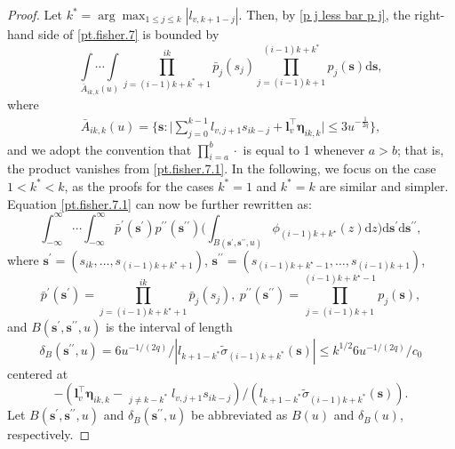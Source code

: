 \documentclass[ejsv2]{imsart}
\theoremstyle{plain}
\theoremstyle{definition}
\theoremstyle{remark}
\begin{document}
\begin{proof}
Let $k^\ast=\arg\max_{1\leq j\leq k}|l_{v,k+1-j}|$. Then, by \eqref{p j less bar p j}, the right-hand side of \eqref{pt.fisher.7} is bounded by
\begin{equation}\label{pt.fisher.7.1}
\underset{\bar{A}_{ik, k}(u)}{\int\cdots\int}\prod_{j=(i-1)k+k^{\ast}+1}^{ik}\bar{p}_j(s_j)\prod_{j=(i-1)k+1}^{(i-1)k+k^{\ast}}p_j(\mathbf{s})\mathrm{d}\mathbf{s},
\end{equation}
where 
\begin{equation*}\label{ing108}
\begin{split}
\bar{A}_{ik,k}(u)
=\bigg\{\mathbf{s}: \bigg|\sum_{j=0}^{k-1}l_{v,j+1}s_{ik-j}+\bm{l}_v^\top\bm{\eta}_{ik, k}\bigg|
\leq 3u^{-\frac{1}{2q}}\bigg\},
\end{split}
\end{equation*}
and we adopt the convention that
$\prod_{i=a}^{b} \cdot$ is equal to 1 whenever
$a>b$; that is, the product
vanishes from \eqref{pt.fisher.7.1}. 
In the following, we focus on the case
$1<k^{*}<k$, as the proofs for the cases
$k^{*}=1$ and $k^{*}=k$
are similar and simpler.
Equation
\eqref{pt.fisher.7.1}
can now be further rewritten as:
\begin{equation}\label{pt.fisher.7.2}
\int_{-\infty}^{\infty}\cdots\int_{-\infty}^{\infty}\bar{p}^{\prime}(\mathbf{s}^\prime)p^{\prime\prime}(\mathbf{s}^{\prime\prime})
\bigg(\int_{B(\mathbf{s}^{\prime},\mathbf{s}^{\prime\prime},u)}\phi_{(i-1)k+k^{\star}}(z)\mathrm{d}z\bigg)\mathrm{d}\mathbf{s}^{\prime}\mathrm{d}\mathbf{s}^{\prime\prime},
\end{equation}
where $\mathbf{s}^{\prime}=(s_{ik},\ldots,s_{(i-1)k+k^{\star}+1})$, $\mathbf{s}^{\prime\prime}=(s_{(i-1)k+k^{\star}-1},\ldots,s_{(i-1)k+1})$, 
$$\bar{p}^{\prime}(\mathbf{s}^\prime)=\prod_{j=(i-1)k+k^\star+1}^{ik}\bar{p}_j(s_j),\ p^{\prime\prime}(\mathbf{s}^{\prime\prime})=\prod_{j=(i-1)k+1}^{(i-1)k+k^\star-1}p_j(\mathbf{s}),$$
and $B(\mathbf{s}^{\prime},\mathbf{s}^{\prime\prime},u)$ is the interval of length 
$$\delta_B(\mathbf{s}^{\prime\prime},u)=6u^{-1/(2q)}/|l_{k+1-k^{\ast}}\tilde{\sigma}_{(i-1)k+k^{\ast}}(\mathbf{s})|
\leq k^{1/2}6u^{-1/(2q)}/c_0$$
centered at
$$-(\bm{l}_v^\top\bm{\eta}_{ik, k}-\mathop{{\sum_{j=0}^{k-1}}}_{j\neq k-k^\ast}l_{v,j+1}s_{ik-j})/(l_{k+1-k^{\ast}}\tilde{\sigma}_{(i-1)k+k^{\ast}}(\mathbf{s})).$$
Let $B(\mathbf{s}^{\prime},\mathbf{s}^{\prime\prime},u)$ and $\delta_B(\mathbf{s}^{\prime\prime},u)$ be abbreviated as $B(u)$ and $\delta_B(u)$, respectively. 

\end{proof}
\end{document}
